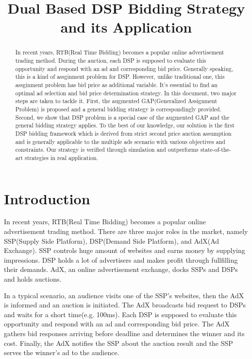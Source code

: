 \documentclass[sigconf]{acmart}
\begin{document}
\title{Dual Based DSP Bidding Strategy and its Application}

\begin{abstract}
In recent years, RTB(Real Time Bidding) becomes a popular online advertisement trading method.
During the auction, each DSP is supposed to evaluate this opportunity and respond with an ad and corresponding bid price.
Generally speaking, this is a kind of assginment problem for DSP.
However, unlike traditional one, this assginment problem has bid price as additional variable.
It's essential to find an optimal ad selection and bid price determination strategy.
In this document, two major steps are taken to tackle it.
First, the augmented GAP(Generalized Assignment Problem) is proposed and a general bidding strategy is correspondingly provided.
Second, we show that DSP problem is a special case of the augmented GAP and the general bidding strategy applies.
To the best of our knowledge, our solution is the first DSP bidding framework
    which is derived from strict second price auction assumption
    and is generally applicable to the multiple ads scenario with various objectives and constraints.
Our strategy is verified through simulation and outperforms state-of-the-art strategies in real application.
\end{abstract}

\maketitle

\section{Introduction}

In recent years, RTB(Real Time Bidding) becomes a popular online advertisement trading method.
There are three major roles in the market, namely SSP(Supply Side Platform), DSP(Demand Side Platform), and AdX(Ad Exchange).
SSP controls huge amount of websites and earns money by supplying impressions.
DSP holds a lot of advertisers and makes profit through fullfilling their demands.
AdX, an online advertisement exchange, docks SSPs and DSPs and holds auctions.

In a typical scenario, an audience visits one of the SSP’s websites, then the AdX is informed and an auction is initiated.
The AdX broadcasts bid request to DSPs and waits for a short time(e.g. 100ms).
Each DSP is supposed to evaluate this opportunity and respond with an ad and corresponding bid price.
The AdX gathers bid responses arriving before deadline and determines the winner and its cost.
Finally, the AdX notifies the SSP about the auction result and the SSP serves the winner’s ad to the audience.
\end{document}
